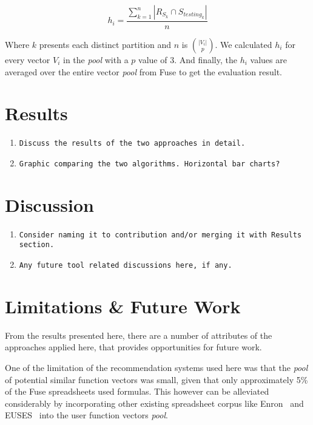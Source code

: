 \documentclass[conference]{IEEEtran}
\begin{document}
\begin{center}
	\[
	h_i = \frac{\sum\limits_{k=1}^{n} |R_{S_k} \cap S_{{testing}_k}|}{n}
	\]
\end{center}

Where $k$ presents each distinct partition and $n$ is $|V_i|\choose p$. We calculated $h_i$ for every vector $V_i$ in the \textit{pool} with a $p$ value of 3. And finally, the $h_i$ values are averaged over the entire vector \textit{pool} from Fuse to get the evaluation result.

\section{Results}

\begin{enumerate}
	\item \texttt{Discuss the results of the two approaches in detail.}
	\item \texttt{Graphic comparing the two algorithms. Horizontal bar charts?}
\end{enumerate}

\section{Discussion}

\begin{enumerate}
	\item \texttt{Consider naming it to contribution and/or merging it with Results section.}
	\item \texttt{Any future tool related discussions here, if any.}
\end{enumerate}

\section{Limitations \& Future Work}
From the results presented here, there are a number of attributes of the approaches applied here, that provides opportunities for future work.

One of the limitation of the recommendation systems used here was that the \textit{pool} of potential similar function vectors was small, given that only approximately 5\% of the Fuse spreadsheets used formulas. This however can be alleviated considerably by incorporating other existing spreadsheet corpus like Enron~\cite{hermans2014enron} and EUSES~\cite{fisher2005euses} into the user function vectors \textit{pool}.
\end{document}
